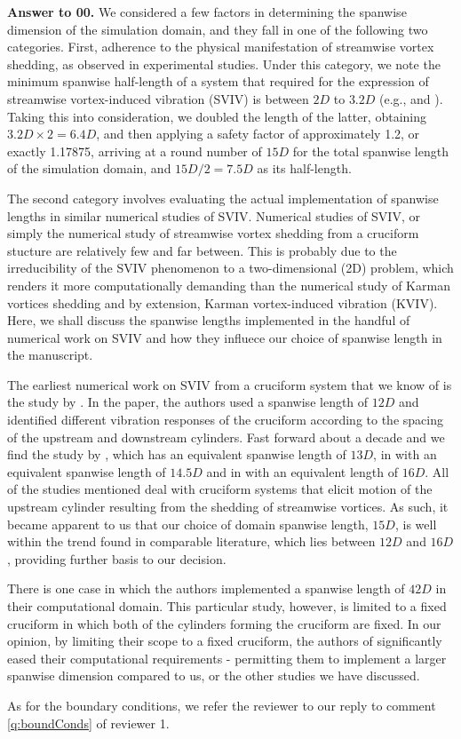 \documentclass[10pt]{article}
\newcounter{question}
\newcommand{\name}{00}
\newcommand{\answer}[1]{\noindent \textbf{Answer to \name.\thequestion}\vskip 0.25cm \noindent #1 \mbox{}\\}
\begin{document}
\answer{
  We considered a few factors in determining the spanwise dimension of the simulation domain, and they fall in one of the following two categories. First, adherence to the physical manifestation of streamwise vortex shedding, as observed in experimental studies. Under this category, we note the minimum spanwise half-length of a system that required for the expression of streamwise vortex-induced vibration (SVIV) is between $2D$ to $3.2D$ (e.g., \citet{Shirakashi2001} and \citet{Koide2006}). Taking this into consideration, we doubled the length of the latter, obtaining $3.2D \times 2 = 6.4D$, and then applying a safety factor of approximately 1.2, or exactly 1.17875, arriving at a round number of $15D$ for the total spanwise length of the simulation domain, and $15D/2 = 7.5D$ as its half-length.

  The second category involves evaluating the actual implementation of spanwise lengths in similar numerical studies of SVIV. Numerical studies of SVIV, or simply the numerical study of streamwise vortex shedding from a cruciform stucture are relatively few and far between. This is probably due to the irreducibility of the SVIV phenomenon to a two-dimensional (2D) problem, which renders it more computationally demanding than the numerical study of Karman vortices shedding and by extension, Karman vortex-induced vibration (KVIV). Here, we shall discuss the spanwise lengths implemented in the handful of numerical work on SVIV and how they influece our choice of spanwise length in the manuscript.

  The earliest numerical work on SVIV from a cruciform system that we know of is the study by \citet{Deng2007}. In the paper, the authors used a spanwise length of $12D$ and identified different vibration responses of the cruciform according to the spacing of the upstream and downstream cylinders. Fast forward about a decade and we find the study by \citet{Hemsuwan2018a}, which has an equivalent spanwise length of $13D$, in \citet{Hemsuwan2018b} with an equivalent spanwise length of $14.5D$ and in \citet{Hemsuwan2018c} with an equivalent length of $16D$. All of the studies mentioned deal with cruciform systems that elicit motion of the upstream cylinder resulting from the shedding of streamwise vortices. As such, it became apparent to us that our choice of domain spanwise length, $15D$, is well within the trend found in comparable literature, which lies between $12D$ and $16D$, providing further basis to our decision.

  There is one case \citep{Zhao2018a} in which the authors implemented a spanwise length of $42D$ in their computational domain. This particular study, however, is limited to a fixed cruciform in which both of the cylinders forming the cruciform are fixed. In our opinion, by limiting their scope to a fixed cruciform, the authors of \citet{Zhao2018a} significantly eased their computational requirements - permitting them to implement a larger spanwise dimension compared to us, or the other studies we have discussed.

  As for the boundary conditions, we refer the reviewer to our reply to comment \ref{q:boundConds} of reviewer 1.
}
\end{document}
